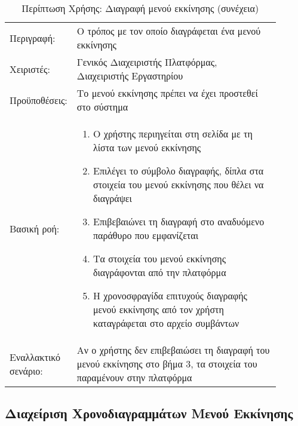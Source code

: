 %
%
\begin{longtable}{|p{0.14\linewidth}|p{0.76\linewidth}|}
	\caption{Περίπτωση Χρήσης: Διαγραφή μενού εκκίνησης} \label{tab:use-case-delete-boot-menu} \\ \hline \endfirsthead
	\caption[{}]{Περίπτωση Χρήσης: Διαγραφή μενού εκκίνησης (συνέχεια)} \\ \endhead \endfoot
	Περιγραφή: & Ο τρόπος με τον οποίο διαγράφεται ένα μενού εκκίνησης \\ \hline
	Χειριστές: & Γενικός Διαχειριστής Πλατφόρμας, Διαχειριστής Εργαστηρίου \\ \hline
	Προϋποθέσεις: & Το μενού εκκίνησης πρέπει να έχει προστεθεί στο σύστημα \\ \hline
	Βασική ροή: &
	\begin{enumerate}
		\vspace{-1cm}
		\addtolength{\itemindent}{-0.4cm}
		\item Ο χρήστης περιηγείται στη σελίδα με τη λίστα των μενού εκκίνησης
		\item Επιλέγει το σύμβολο διαγραφής, δίπλα στα στοιχεία του μενού εκκίνησης που θέλει να διαγράψει
		\item Επιβεβαιώνει τη διαγραφή στο αναδυόμενο παράθυρο που εμφανίζεται
		\item Τα στοιχεία του μενού εκκίνησης διαγράφονται από την πλατφόρμα
		\item Η χρονοσφραγίδα επιτυχούς διαγραφής μενού εκκίνησης από τον χρήστη καταγράφεται στο αρχείο συμβάντων
		\vspace{-0.7cm}
	\end{enumerate} \\ \hline
	Εναλλακτικό σενάριο: & Αν ο χρήστης δεν επιβεβαιώσει τη διαγραφή του μενού εκκίνησης στο βήμα 3, τα στοιχεία του παραμένουν στην πλατφόρμα \\ \hline
\end{longtable}

\break
\subsection{Διαχείριση Χρονοδιαγραμμάτων Μενού Εκκίνησης}


